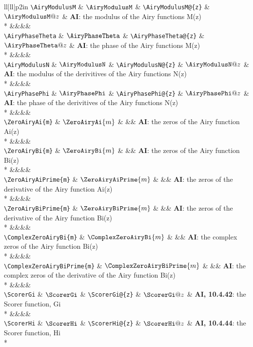 \begin{supertabular}{ll|ll|p{2in}}
\verb~\AiryModulusM~ & $\AiryModulusM$ & 
\verb~\AiryModulusM@{z}~ & $\AiryModulusM@{z}$ & 
\textbf{AI}: the modulus of the Airy functions M(z)\\*
&&&&\\[-1ex]
\verb~\AiryPhaseTheta~ & $\AiryPhaseTheta$ & 
\verb~\AiryPhaseTheta@{z}~ & $\AiryPhaseTheta@{z}$ & 
\textbf{AI}: the phase of the Airy functions M(z)\\*
&&&&\\[-1ex]
\verb~\AiryModulusN~ & $\AiryModulusN$ & 
\verb~\AiryModulusN@{z}~ & $\AiryModulusN@{z}$ & 
\textbf{AI}: the modulus of the derivitives of the Airy functions N(z)\\*
&&&&\\[-1ex]
\verb~\AiryPhasePhi~ & $\AiryPhasePhi$ & 
\verb~\AiryPhasePhi@{z}~ & $\AiryPhasePhi@{z}$ & 
\textbf{AI}: the phase of the derivitives of the Airy functions N(z)\\*
&&&&\\[-1ex]
\verb~\ZeroAiryAi{m}~ & $\ZeroAiryAi{m}$ & 
&&
\textbf{AI}: the zeros of the Airy function Ai(z)\\*
&&&&\\[-1ex]
\verb~\ZeroAiryBi{m}~ & $\ZeroAiryBi{m}$ & 
&&
\textbf{AI}: the zeros of the Airy function Bi(z)\\*
&&&&\\[-1ex]
\verb~\ZeroAiryAiPrime{m}~ & $\ZeroAiryAiPrime{m}$ & 
&&
\textbf{AI}: the zeros of the derivative of the Airy function Ai(z)\\*
&&&&\\[-1ex]
\verb~\ZeroAiryBiPrime{m}~ & $\ZeroAiryBiPrime{m}$ & 
&&
\textbf{AI}: the zeros of the derivative of the Airy function Bi(z)\\*
&&&&\\[-1ex]
\verb~\ComplexZeroAiryBi{m}~ & $\ComplexZeroAiryBi{m}$ & 
&&
\textbf{AI}: the complex zeros of the Airy function Bi(z)\\*
&&&&\\[-1ex]
\verb~\ComplexZeroAiryBiPrime{m}~ & $\ComplexZeroAiryBiPrime{m}$ & 
&&
\textbf{AI}: the complex zeros of the derivative of the Airy function Bi(z)\\*
&&&&\\[-1ex]
\verb~\ScorerGi~ & $\ScorerGi$ & 
\verb~\ScorerGi@{z}~ & $\ScorerGi@{z}$ & 
\textbf{AI, 10.4.42}: the Scorer function, Gi\\*
&&&&\\[-1ex]
\verb~\ScorerHi~ & $\ScorerHi$ & 
\verb~\ScorerHi@{z}~ & $\ScorerHi@{z}$ & 
\textbf{AI, 10.4.44}: the Scorer function, Hi\\*

\end{supertabular}
